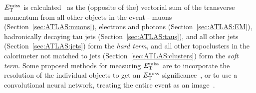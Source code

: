 $E_{\text{T}}^\text{miss}$ is calculated~\cite{Aad:2016nrq,Aaboud:2018tkc,ATLAS-CONF-2018-023} as the (opposite of the) vectorial sum of the transverse momentum from all other objects in the event - muons (Section~\ref{sec:ATLAS:muons}), electrons and photons (Section~\ref{sec:ATLAS:EM}), hadronically decaying tau jets (Section~\ref{sec:ATLAS:taus}), and all other jets (Section~\ref{sec:ATLAS:jets}) form the \textit{hard term}, and all other topoclusters in the calorimeter not matched to jets (Section~\ref{sec:ATLAS:clusters}) form the \textit{soft term}.
Some proposed methods for measuring $E_{\text{T}}^\text{miss}$ are to incorporate the \pt{} resolution of the individual objects to get an $E_{\text{T}}^\text{miss}$ significance~\cite{ATLAS-CONF-2018-038}, or to use a convolutional neural network, treating the entire event as an image~\cite{ATL-PHYS-PUB-2019-028}.

